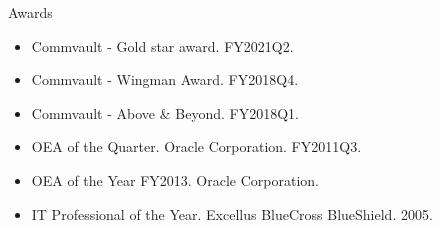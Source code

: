 \documentclass{resume} %
\begin{document}
\begin{rSection}{Awards}
  \begin{itemize}
   \itemsep -3pt {} 
   \item Commvault - Gold star award. FY2021Q2.
   \item Commvault - Wingman Award. FY2018Q4.
   \item Commvault - Above \& Beyond. FY2018Q1.
   \item OEA of the Quarter. Oracle Corporation. FY2011Q3.
   \item OEA of the Year FY2013. Oracle Corporation.
   \item IT Professional of the Year. Excellus BlueCross BlueShield. 2005.
  \end{itemize}  
\end{rSection}
\end{document}
